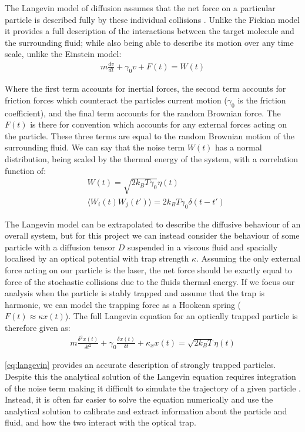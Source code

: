 The Langevin model of diffusion assumes that the net force on a 
particular particle is described fully by these individual 
collisions \cite{Gillespie2012c}. Unlike the Fickian model it 
provides a full description of the interactions between the target 
molecule and the surrounding fluid; while also being able to 
describe its motion over any time scale, unlike the Einstein model:
\begin{align}
	m\frac{dv}{dt} + \gamma_0 v + F(t) = W(t)
\end{align}

Where the first term accounts for inertial forces, the second term 
accounts for friction forces which counteract the particles current 
motion ($\gamma_0$ is the friction coefficient), and the final term 
accounts for the random Brownian force. The $F(t)$ is there for 
convention which accounts for any external forces acting on the 
particle. These three terms are equal to the random Brownian motion 
of the surrounding fluid. We can say that the noise term $W(t)$ has 
a normal distribution, being scaled by the thermal energy of the 
system, with a correlation function of:
\begin{align}
	&W(t) = \sqrt{2k_BT\gamma_0}\eta(t) \\
	&\langle W_i(t)W_j(t')\rangle = 2k_BT\gamma_0\delta(t-t')
\end{align}

The Langevin model can be extrapolated to describe the diffusive behaviour 
of an overall system, but for this project we can instead consider the 
behaviour of some particle with a diffusion tensor $D$ suspended in a 
viscous fluid and spacially localised by an optical potential with trap 
strength $\kappa$. Assuming the only external force acting on our particle 
is the laser, the net force should be exactly equal to force of the stochastic
collisions due to the fluids thermal energy. If we focus our analysis when 
the particle is stably trapped and assume that the trap is harmonic, we can 
model the trapping force as a Hookean spring ($F(t) \approx \kappa x(t)$). 
The full Langevin equation for an optically trapped particle is therefore given as:
\begin{align}
	\label{eq:langevin}
	m\frac{\delta^2x(t)}{\delta t^2} + \gamma_0 \frac{\delta x(t)}{\delta t} + \kappa_x x(t) = \sqrt{2k_BT}\eta(t)
\end{align}

\eqref{eq:langevin} provides an accurate description of strongly trapped 
particles. Despite this the analytical solution of the Langevin equation requires 
integration of the noise term making it difficult to simulate the 
trajectory of a given particle \cite{Volpe2013}. Instead, it is often far 
easier to solve the equation numerically and use the analytical 
solution to calibrate and extract information about the particle and fluid, 
and how the two interact with the optical trap.

